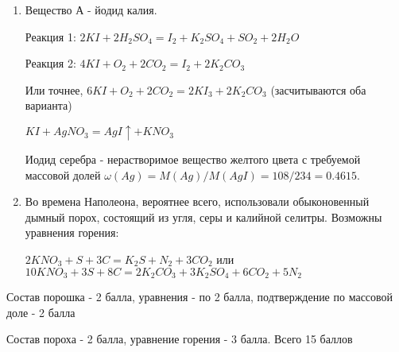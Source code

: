 \solutionSection

\begin{enumerate}
    \item Вещество А - йодид калия.

    Реакция 1: $2KI + 2H_2SO_4 = I_2 + K_2SO_4 + SO_2 + 2H_2O$

    Реакция 2: $4KI + O_2 + 2CO_2 = I_2 + 2K_2CO_3$
    
    Или точнее, $6KI + O_2 + 2CO_2 = 2KI_3 + 2K_2CO_3$ (засчитываются оба варианта)

    $KI + AgNO_3 = AgI \uparrow + KNO_3$

    Иодид серебра - нерастворимое вещество желтого цвета с требуемой массовой долей $\omega(Ag)= M(Ag)/M(AgI) = 108/234 = 0.4615$.
    \item Во времена Наполеона, вероятнее всего, использовали обыконовенный дымный порох, состоящий из угля, серы и калийной селитры. Возможны уравнения горения:
    
    $2KNO_3 + S + 3C = K_2S + N_2 + 3CO_2$ или $10KNO_3 + 3S + 8C = 2K_2CO_3 + 3K_2SO_4 + 6CO_2 + 5N_2$
    
\end{enumerate}

Состав порошка - 2 балла, уравнения - по 2 балла, подтверждение по массовой доле  - 2 балла

Состав пороха - 2 балла,  уравнение горения - 3 балла. Всего 15 баллов
